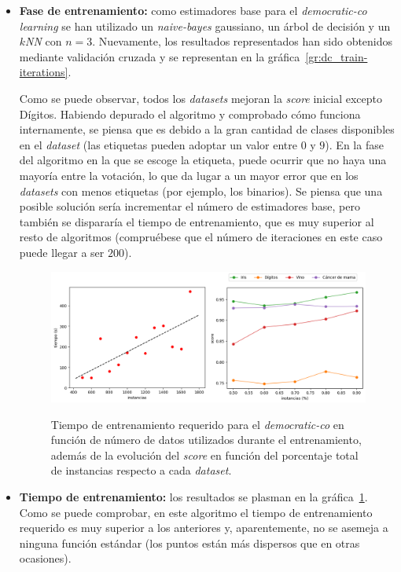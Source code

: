 \begin{itemize}
	\item \textbf{Fase de entrenamiento:} como estimadores base para el \textit{democratic-co learning} se han utilizado un \textit{naive-bayes} gaussiano, un árbol de decisión y un \textit{$k$NN} con $n = 3$. Nuevamente, los resultados representados han sido obtenidos mediante validación cruzada y se representan en la gráfica~\ref{gr:dc_train-iterations}.
	
	Como se puede observar, todos los \textit{datasets} mejoran la \textit{score} inicial excepto Dígitos. Habiendo depurado el algoritmo y comprobado cómo funciona internamente, se piensa que es debido a la gran cantidad de clases disponibles en el \textit{dataset} (las etiquetas pueden adoptar un valor entre $0$ y $9$). En la fase del algoritmo en la que se escoge la etiqueta, puede ocurrir que no haya una mayoría entre la votación, lo que da lugar a un mayor error que en los \textit{datasets} con menos etiquetas (por ejemplo, los binarios). Se piensa que una posible solución sería incrementar el número de estimadores base, pero también se dispararía el tiempo de entrenamiento, que es muy superior al resto de algoritmos (compruébese que el número de iteraciones en este caso puede llegar a ser $200$).
	
\begin{figure}[h]
	\caption[\textit{Democratic-co}: resultados (tiempo-porcentaje)]{Tiempo de entrenamiento requerido para el \textit{democratic-co} en función de número de datos utilizados durante el entrenamiento, además de la evolución del \textit{score} en función del porcentaje total de instancias respecto a cada \textit{dataset}.}
	\centering
	\includegraphics[scale=0.4]{../img/memoria/5_democraticco_time-percentage}
	\label{gr:dc_time-percentage}
\end{figure}
	
	\item \textbf{Tiempo de entrenamiento:} los resultados se plasman en la gráfica~\ref{gr:dc_time-percentage}. Como se puede comprobar, en este algoritmo el tiempo de entrenamiento requerido es muy superior a los anteriores y, aparentemente, no se asemeja a ninguna función estándar (los puntos están más dispersos que en otras ocasiones).
	

\end{itemize}
